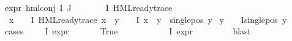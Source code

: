 \begin{isabellebody}
{\isachardoublequoteopen}expr{\isacharunderscore}{\kern0pt}{}\ {\isacharparenleft}{\kern0pt}hml{\isacharunderscore}{\kern0pt}conj\ I\ J\ {\isasymPhi}{\isacharparenright}{\kern0pt}\ {\isasymle}\ {}{\isachardoublequoteclose}\ {\isachardoublequoteopen}{\isasymforall}{\isasymphi}\ {\isasymin}\ {\isacharparenleft}{\kern0pt}{\isasymPhi}\ {\isacharbackquote}{\kern0pt}\ I{\isacharparenright}{\kern0pt}{\isachardot}{\kern0pt}\ HML{\isacharunderscore}{\kern0pt}ready{\isacharunderscore}{\kern0pt}trace\ {\isasymphi}{\isachardoublequoteclose}\isanewline
{}\ {\isachardoublequoteopen}{\isacharparenleft}{\kern0pt}{\isasymexists}x\ {\isasymin}\ {\isacharparenleft}{\kern0pt}{\isasymPhi}\ {\isacharbackquote}{\kern0pt}\ I{\isacharparenright}{\kern0pt}{\isachardot}{\kern0pt}\ HML{\isacharunderscore}{\kern0pt}ready{\isacharunderscore}{\kern0pt}trace\ x\ {\isasymand}\ {\isacharparenleft}{\kern0pt}{\isasymforall}y\ {\isasymin}\ {\isacharparenleft}{\kern0pt}{\isasymPhi}\ {\isacharbackquote}{\kern0pt}\ I{\isacharparenright}{\kern0pt}{\isachardot}{\kern0pt}\ x\ {\isasymnoteq}\ y\ {\isasymlongrightarrow}\ single{\isacharunderscore}{\kern0pt}pos\ y{\isacharparenright}{\kern0pt}{\isacharparenright}{\kern0pt}\isanewline
{\isasymor}\ {\isacharparenleft}{\kern0pt}{\isasymforall}y\ {\isasymin}\ {\isacharparenleft}{\kern0pt}{\isasymPhi}\ {\isacharbackquote}{\kern0pt}\ I{\isacharparenright}{\kern0pt}{\isachardot}{\kern0pt}single{\isacharunderscore}{\kern0pt}pos\ y{\isacharparenright}{\kern0pt}{\isachardoublequoteclose}\isanewline
%
\isadelimproof
%
\endisadelimproof
%
\isatagproof
{}\isamarkupfalse%
{\isacharparenleft}{\kern0pt}cases\ {\isachardoublequoteopen}{\isasymexists}{\isasympsi}\ {\isasymin}\ {\isacharparenleft}{\kern0pt}{\isasymPhi}\ {\isacharbackquote}{\kern0pt}\ I{\isacharparenright}{\kern0pt}{\isachardot}{\kern0pt}\ expr{\isacharunderscore}{\kern0pt}{}\ {\isasympsi}\ {\isasymge}\ {}{\isachardoublequoteclose}{\isacharparenright}{\kern0pt}\isanewline
\ \ \isamarkupfalse%
\ True\isanewline
\ \ \isamarkupfalse%
\ \isamarkupfalse%
\ {\isasympsi}\ \ {\isachardoublequoteopen}{\isasympsi}\ {\isasymin}\ {\isacharparenleft}{\kern0pt}{\isasymPhi}\ {\isacharbackquote}{\kern0pt}\ I{\isacharparenright}{\kern0pt}{\isachardoublequoteclose}\ {\isachardoublequoteopen}expr{\isacharunderscore}{\kern0pt}{}\ {\isasympsi}\ {\isasymge}\ {}{\isachardoublequoteclose}\isanewline
\ \ \ \ \isamarkupfalse%
\ blast\isanewline

\end{isabellebody}

